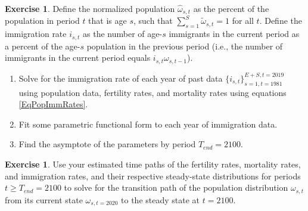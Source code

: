 \documentclass[letterpaper,12pt]{article}
\theoremstyle{definition}
\newtheorem{exercise}[theorem]{Exercise}
\begin{document}
  \begin{exercise}\label{ExImmEst}
    Define the normalized population $\hat{\omega}_{s,t}$ as the percent of the population in period $t$ that is age $s$, such that $\sum_{s=1}^S\tilde{\omega}_{s,t} = 1$ for all $t$. Define the immigration rate $i_{s,t}$ as the number of age-$s$ immigrants in the current period as a percent of the age-$s$ population in the previous period (i.e., the number of immigrants in the current period equals $i_{s,t}\omega_{s,t-1}$).
    \begin{enumerate}
      \item Solve for the immigration rate of each year of past data $\{i_{s,t}\}_{s=1,t=1981}^{E+S,t=2019}$ using population data, fertility rates, and mortality rates using equations \eqref{EqPopImmRates}.
      \item Fit some parametric functional form to each year of immigration data.
      \item Find the asymptote of the parameters by period $T_{end}=2100$.
    \end{enumerate}
  \end{exercise}

  \begin{exercise}\label{ExImmEst}
    Use your estimated time paths of the fertility rates, mortality rates, and immigration rates, and their respective steady-state distributions for periods $t\geq T_{end}=2100$ to solve for the transition path of the population distribution $\omega_{s,t}$ from its current state $\omega_{s,t=2020}$ to the steady state at $t=2100$.
  \end{exercise}



  \renewcommand\theenumi{\roman{enumi}}



\end{document}
